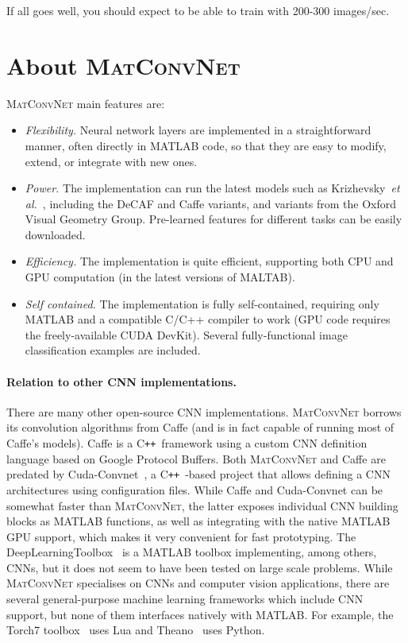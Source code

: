 \documentclass[12pt]{article}
\newcommand{\vlnn}{\textsc{MatConvNet}\xspace}
\newcommand{\cpp}{C{}\texttt{++}~}
\begin{document}
If all goes well, you should expect to be able to train with 200-300 images/sec.

\section{About \vlnn}

\vlnn main features are:
\begin{itemize}
\item \emph{Flexibility.} Neural network layers are implemented in a straightforward manner, often directly in MATLAB code, so that they are easy to modify, extend, or integrate with new ones.
\item \emph{Power.} The implementation can run the latest models such as Krizhevsky~\textit{et al.}~\cite{krizhevsky12imagenet}, including the DeCAF and Caffe variants, and variants from the Oxford Visual Geometry Group. Pre-learned features for different tasks can be easily downloaded.
\item \emph{Efficiency.} The implementation is quite efficient, supporting both CPU and GPU computation (in the latest versions of MALTAB).
\item \emph{Self contained.} The implementation is fully self-contained, requiring only MATLAB and a compatible C/C++ compiler to work (GPU code requires the freely-available CUDA DevKit). Several fully-functional image classification examples are included.\end{itemize}

\paragraph{Relation to other CNN implementations.} There are many other open-source CNN implementations. \vlnn borrows its convolution algorithms from Caffe (and is in fact capable of running most of Caffe's models). Caffe is a \cpp framework using a custom CNN definition language based on Google Protocol Buffers. Both \vlnn and Caffe are predated by Cuda-Convnet~\cite{krizhevsky12imagenet}, a \cpp-based project that allows defining a CNN architectures using configuration files. While Caffe and Cuda-Convnet can be somewhat faster than \vlnn, the latter exposes individual CNN building blocks as MATLAB functions, as well as integrating with the native MATLAB GPU support, which makes it very convenient for fast prototyping. The DeepLearningToolbox~\cite{deepltbx12} is a MATLAB toolbox implementing, among others, CNNs, but it does not seem to have been tested on large scale problems. While \vlnn specialises on CNNs and computer vision applications, there are several general-purpose machine learning frameworks which include CNN support, but none of them interfaces natively with MATLAB. For example, the Torch7 toolbox~\cite{collobert2011torch7} uses Lua and Theano~\cite{bergstra2010} uses Python.
\end{document}
